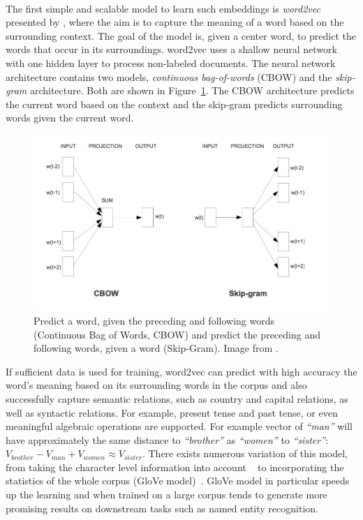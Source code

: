 \\
\noindent
The first simple and scalable model to learn such embeddings is \emph{word2vec} presented by , where the aim is to capture the meaning of a word based on the surrounding context. The goal of the model is, given a center word, to predict the words that occur in its surroundings. word2vec uses a shallow neural network with one hidden layer to process non-labeled documents. The neural network architecture contains two models, \emph{continuous bag-of-words} (CBOW) and the \emph{skip-gram} architecture. Both are shown in Figure~\ref{fig:skip_gram}. The CBOW architecture predicts the current word based on the context and the skip-gram predicts surrounding words given the current word.
\begin{figure}
\centering

\includegraphics[width=0.7\linewidth , height=0.5\linewidth]{images/CBOW_SkipGram.png}
\caption{Predict a word, given the preceding and following words (Continuous Bag of Words, CBOW) and predict the preceding and following words, given a word (Skip-Gram). Image from .}
\label{fig:skip_gram}
\end{figure}
If sufficient data is used for training, word2vec can predict with high accuracy the word's meaning based on its surrounding words in the corpus and also successfully capture semantic relations, such as country and capital relations, as well as syntactic relations. For example, present tense and past tense, or even meaningful algebraic operations are supported. For example vector of  \emph{``man''} will have approximately the same distance to  \emph{``brother''} as \emph{``women''} to \emph{``sister''}: $V_{brother}-  V_{man} +V_{women} \approx V_{sister}$. There exists numerous variation of this model, from taking the character level information into account ~ to incorporating the statistics of the whole corpus (GloVe model)~. GloVe model in particular speeds up the learning and when trained on a large corpus tends to generate more promising results on downstream tasks such as named entity recognition.\\
